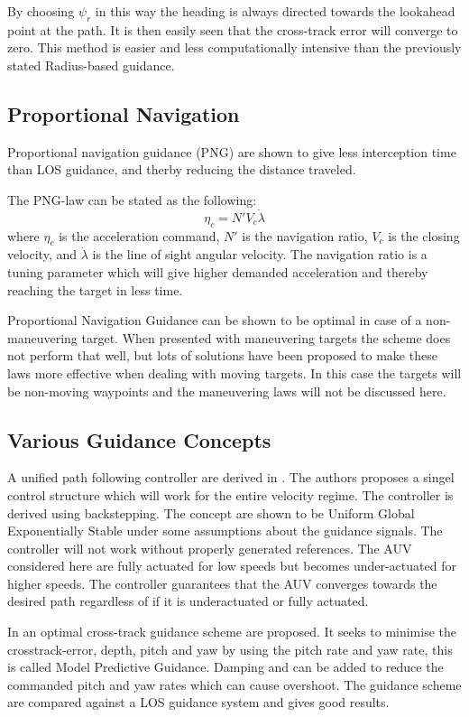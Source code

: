 		By choosing $\psi_r$ in this way the heading is always directed towards the lookahead point at
		the path. It is then easily seen that the cross-track error will converge to zero. This
		method is easier and less computationally intensive than the previously stated Radius-based
		guidance. \cite{guidance_planar_path}
	
	\subsection{Proportional Navigation}
		Proportional navigation guidance (PNG) are shown to give less interception time than LOS guidance,
		and therby reducing the distance traveled. \cite{GuidanceReview}
		
		The PNG-law can be stated as the following:
		\begin{equation}
			\eta_c = N' V_c \dot{\lambda}
		\end{equation}
		where $\eta_c$ is the acceleration command, $N'$ is the navigation ratio, $V_c$ is the closing
		velocity, and $\dot{\lambda}$ is the line of sight angular velocity. The navigation ratio is a
		tuning parameter which will give higher demanded acceleration and thereby reaching the target 
		in less	time.
		
		Proportional Navigation Guidance can be shown to be optimal in case of a non-maneuvering
		target. When presented with maneuvering targets the scheme does not perform that well, but lots of
		solutions have been proposed to make these laws more effective when dealing with moving
		targets. In this case the targets will be non-moving waypoints and the maneuvering laws
		will not be discussed here.

	\subsection{Various Guidance Concepts}
		A unified path following controller are derived in \cite{control-concept-AUV}. The 
		authors proposes a singel control structure which will work for the entire velocity regime.
		The controller is derived using backstepping. The concept are shown to be Uniform Global
		Exponentially Stable under some assumptions about the guidance signals. The controller will not
		work without properly generated references. The AUV considered here are fully actuated for low
		speeds but becomes under-actuated for higher speeds. The controller guarantees that the AUV
		converges towards the desired path regardless of if it is underactuated or fully actuated.
		
		In \cite{optimal-cross-track} an optimal cross-track guidance scheme are proposed. It seeks to
		minimise the crosstrack-error, depth, pitch and yaw by using the pitch rate and yaw rate, this
		is called Model	Predictive Guidance. Damping and can be added to reduce the commanded
		pitch and yaw rates which can cause overshoot. The guidance scheme are compared against a LOS
		guidance system and gives good results.
	

